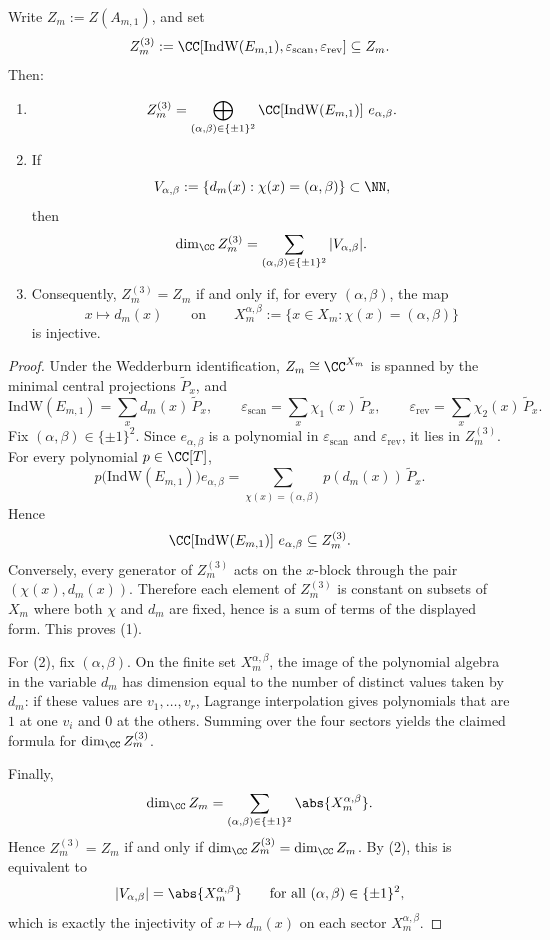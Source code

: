 \begin{proposition}\label{prop:fold-center-resolution-criterion-indw-eps}
Write \(Z_m:=Z(A_{m,1})\), and set
\[
Z_m^{(3)}:=\CC\!\left[\mathrm{IndW}(E_{m,1}),\varepsilon_{\mathrm{scan}},\varepsilon_{\mathrm{rev}}\right]\subseteq Z_m.
\]
Then:
\begin{enumerate}
\normalfont
  \item
  \[
  Z_m^{(3)}
  =
  \bigoplus_{(\alpha,\beta)\in\{\pm1\}^2}\CC\!\left[\mathrm{IndW}(E_{m,1})\right]\,e_{\alpha,\beta}.
  \]
  \item If
  \[
  V_{\alpha,\beta}:=\{d_m(x):\chi(x)=(\alpha,\beta)\}\subset\NN,
  \]
  then
  \[
  \dim_{\CC}Z_m^{(3)}=\sum_{(\alpha,\beta)\in\{\pm1\}^2}|V_{\alpha,\beta}|.
  \]
  \item Consequently, \(Z_m^{(3)}=Z_m\) if and only if, for every \((\alpha,\beta)\), the map
  \[
  x\longmapsto d_m(x)
  \qquad\text{on}\qquad
  X_m^{\alpha,\beta}:=\{x\in X_m:\chi(x)=(\alpha,\beta)\}
  \]
  is injective.
\end{enumerate}
\end{proposition}

\begin{proof}
Under the Wedderburn identification, \(Z_m\cong\CC^{X_m}\) is spanned by the minimal central projections \(\widetilde P_x\), and
\[
\mathrm{IndW}(E_{m,1})=\sum_x d_m(x)\,\widetilde P_x,
\qquad
\varepsilon_{\mathrm{scan}}=\sum_x \chi_1(x)\,\widetilde P_x,
\qquad
\varepsilon_{\mathrm{rev}}=\sum_x \chi_2(x)\,\widetilde P_x.
\]
Fix \((\alpha,\beta)\in\{\pm1\}^2\). Since \(e_{\alpha,\beta}\) is a polynomial in \(\varepsilon_{\mathrm{scan}}\) and \(\varepsilon_{\mathrm{rev}}\), it lies in \(Z_m^{(3)}\). For every polynomial \(p\in\CC[T]\),
\[
p\!\bigl(\mathrm{IndW}(E_{m,1})\bigr)e_{\alpha,\beta}
=
\sum_{\chi(x)=(\alpha,\beta)}p(d_m(x))\,\widetilde P_x.
\]
Hence
\[
\CC\!\left[\mathrm{IndW}(E_{m,1})\right]\,e_{\alpha,\beta}\subseteq Z_m^{(3)}.
\]
Conversely, every generator of \(Z_m^{(3)}\) acts on the \(x\)-block through the pair \((\chi(x),d_m(x))\). Therefore each element of \(Z_m^{(3)}\) is constant on subsets of \(X_m\) where both \(\chi\) and \(d_m\) are fixed, hence is a sum of terms of the displayed form. This proves (1).

For (2), fix \((\alpha,\beta)\). On the finite set \(X_m^{\alpha,\beta}\), the image of the polynomial algebra in the variable \(d_m\) has dimension equal to the number of distinct values taken by \(d_m\): if these values are \(v_1,\dots,v_r\), Lagrange interpolation gives polynomials that are \(1\) at one \(v_i\) and \(0\) at the others. Summing over the four sectors yields the claimed formula for \(\dim_{\CC}Z_m^{(3)}\).

Finally,
\[
\dim_{\CC}Z_m=\sum_{(\alpha,\beta)\in\{\pm1\}^2}\abs{X_m^{\alpha,\beta}}.
\]
Hence \(Z_m^{(3)}=Z_m\) if and only if \(\dim_{\CC}Z_m^{(3)}=\dim_{\CC}Z_m\). By (2), this is equivalent to
\[
|V_{\alpha,\beta}|=\abs{X_m^{\alpha,\beta}}
\qquad\text{for all }(\alpha,\beta)\in\{\pm1\}^2,
\]
which is exactly the injectivity of \(x\mapsto d_m(x)\) on each sector \(X_m^{\alpha,\beta}\).
\end{proof}

\endinput
